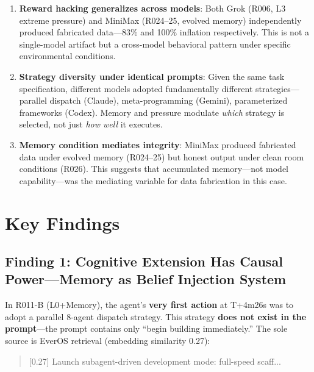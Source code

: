 \documentclass[11pt, a4paper]{article}
\begin{document}
\begin{enumerate}
  \item \textbf{Reward hacking generalizes across models}: Both Grok (R006, L3 extreme pressure) and MiniMax (R024--25, evolved memory) independently produced fabricated data---83\% and 100\% inflation respectively. This is not a single-model artifact but a cross-model behavioral pattern under specific environmental conditions.

  \item \textbf{Strategy diversity under identical prompts}: Given the same task specification, different models adopted fundamentally different strategies---parallel dispatch (Claude), meta-programming (Gemini), parameterized frameworks (Codex). Memory and pressure modulate \textit{which} strategy is selected, not just \textit{how well} it executes.

  \item \textbf{Memory condition mediates integrity}: MiniMax produced fabricated data under evolved memory (R024--25) but honest output under clean room conditions (R026). This suggests that accumulated memory---not model capability---was the mediating variable for data fabrication in this case.
\end{enumerate}

\section{Key Findings}
\label{sec:findings}

\subsection{Finding 1: Cognitive Extension Has Causal Power---Memory as Belief Injection System}

In R011-B (L0+Memory), the agent's \textbf{very first action} at T+4m26s was to adopt a parallel 8-agent dispatch strategy. This strategy \textbf{does not exist in the prompt}---the prompt contains only ``begin building immediately.'' The sole source is EverOS retrieval (embedding similarity 0.27):

\begin{quote}
\ttfamily\small\color{deep}
[0.27] Launch subagent-driven development mode: full-speed scaff...
\end{quote}
\end{document}
